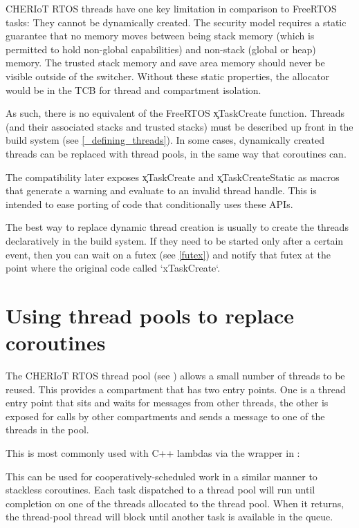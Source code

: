 CHERIoT RTOS threads have one key limitation in comparison to FreeRTOS tasks:
They cannot be dynamically created.
The security model requires a static guarantee that no memory moves between being stack memory (which is permitted to hold non-global capabilities) and non-stack (global or heap) memory.
The trusted stack memory and save area memory should never be visible outside of the switcher.
Without these static properties, the allocator would be in the TCB for thread and compartment isolation.

As such, there is no equivalent of the FreeRTOS \c{xTaskCreate} function.
Threads (and their associated stacks and trusted stacks) must be described up front in the build system (see \ref{_defining_threads}).
In some cases, dynamically created threads can be replaced with thread pools, in the same way that coroutines can.

The compatibility later exposes \c{xTaskCreate} and \c{xTaskCreateStatic} as macros that generate a warning and evaluate to an invalid thread handle.
This is intended to ease porting of code that conditionally uses these APIs.

The best way to replace dynamic thread creation is usually to create the threads declaratively in the build system.
If they need to be started only after a certain event, then you can wait on a futex (see \ref{futex}) and notify that futex at the point where the original code called `xTaskCreate`.

\section{Using thread pools to replace coroutines}

The CHERIoT RTOS thread pool (see ) allows a small number of threads to be reused.
This provides a compartment that has two entry points.
One is a thread entry point that sits and waits for messages from other threads, the other is exposed for calls by other compartments and sends a message to one of the threads in the pool.

This is most commonly used with C++ lambdas via the  wrapper in :

\begin{cxxsnippet}
async([]() {
	// This runs in the caller's compartment but in another thread.
\})
\end{cxxsnippet}

This can be used for cooperatively-scheduled work in a similar manner to stackless coroutines.
Each task dispatched to a thread pool will run until completion on one of the threads allocated to the thread pool.
When it returns, the thread-pool thread will block until another task is available in the queue.


